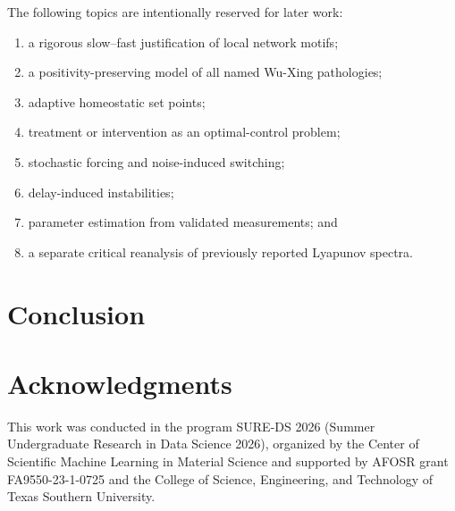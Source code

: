 \documentclass[11pt, reqno]{amsart}
\theoremstyle{definition}
\theoremstyle{remark}
\begin{document}
The following topics are intentionally reserved for later work:
\begin{enumerate}[label=(\roman*),leftmargin=2.5em]
    \item a rigorous slow--fast justification of local network motifs;
    \item a positivity-preserving model of all named Wu-Xing pathologies;
    \item adaptive homeostatic set points;
    \item treatment or intervention as an optimal-control problem;
    \item stochastic forcing and noise-induced switching;
    \item delay-induced instabilities;
    \item parameter estimation from validated measurements; and
    \item a separate critical reanalysis of previously reported Lyapunov
    spectra.
\end{enumerate}

\section{Conclusion}
\label{sec:conclusion}


\section*{Acknowledgments}

This work was conducted in the program SURE-DS 2026 (Summer Undergraduate
Research in Data Science 2026), organized by the Center of Scientific Machine
Learning in Material Science and supported by AFOSR grant FA9550-23-1-0725 and
the College of Science, Engineering, and Technology of Texas Southern
University.

\end{document}
